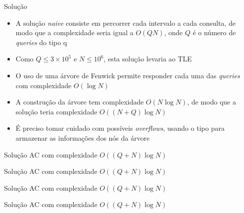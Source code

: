 \begin{frame}[fragile]{Solução}

    \begin{itemize}
        \item A solução \textit{naive} consiste em percorrer cada intervalo a cada consulta,
            de modo que a complexidade seria igual a $O(QN)$, onde $Q$ é o número de 
            \textit{queries} do tipo q

        \item Como $Q\leq 3\times 10^5$ e $N\leq 10^6$, esta solução levaria ao TLE

        \item O uso de uma árvore de Fenwick permite responder cada uma das \textit{queries}
            com complexidade $O(\log N)$

        \item A construção da árvore tem complexidade $O(N\log N)$, de modo que a solução teria
            complexidade $O((N + Q)\log N)$

        \item É preciso tomar cuidado com possíveis \textit{overflows}, usando o tipo
             para armazenar as informações dos nós da árvore
   \end{itemize}

\end{frame}

\begin{frame}[fragile]{Solução AC com complexidade $O((Q + N)\log N)$}
\end{frame}

\begin{frame}[fragile]{Solução AC com complexidade $O((Q + N)\log N)$}
\end{frame}

\begin{frame}[fragile]{Solução AC com complexidade $O((Q + N)\log N)$}
\end{frame}

\begin{frame}[fragile]{Solução AC com complexidade $O((Q + N)\log N)$}
\end{frame}
